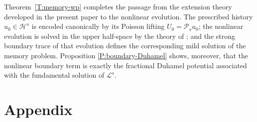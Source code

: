 \documentclass[11pt,letter]{amsart}
\numberwithin{equation}{section}
\newcommand{\Le}{\mathcal L}
\numberwithin{equation}{section}
\begin{document}
Theorem~\ref{T:memory-wp} completes the passage from the extension
theory developed in the present paper to the nonlinear evolution.
The prescribed history \(u_0\in\mathcal H^s\) is encoded canonically
by its Poisson lifting \(U_0=\mathcal P_su_0\); the nonlinear
evolution is solved in the upper half-space by the theory of
\cite{GS2}; and the strong boundary trace of that evolution defines
the corresponding mild solution of the memory problem. Proposition
\ref{P:boundary-Duhamel} shows, moreover, that the nonlinear boundary
term is exactly the fractional Duhamel potential associated with the
fundamental solution of \(\Le^s\).








\section{Appendix}\label{S:app}
\end{document}
